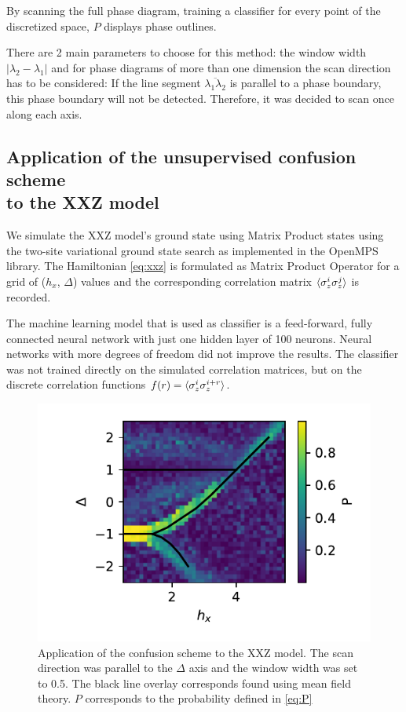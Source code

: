 \documentclass[prl, reprint, twocolumn]{revtex4-1}
\begin{document}
	By scanning the full phase diagram, training a classifier for every point of the discretized space, $P$ displays phase outlines.
	
	There are 2 main parameters to choose for this method: the window width $|\lambda_2-\lambda_1|$ and for phase diagrams of more than one dimension the scan direction has to be considered: If the line segment $\overline{\lambda_1\lambda_2}$ is parallel to a phase boundary, this phase boundary will not be detected.
	Therefore, it was decided to scan once along each axis.
	
	
	
	\subsection{Application of the unsupervised confusion scheme \\ to the XXZ model}
	We simulate the XXZ model's ground state using Matrix Product states\cite{Schollwoeck2011} using the two-site variational ground state search as implemented in the OpenMPS library\cite{Jaschke2018, Wall2012}. The Hamiltonian \ref{eq:xxz} is formulated as Matrix Product Operator for a grid of ($h_x$, $\Delta$) values and the corresponding correlation matrix $\braket{\sigma^i_z\sigma^j_z}$ is recorded.
	
	The machine learning model that is used as classifier is a feed-forward, fully connected neural network with just one hidden layer of 100 neurons. Neural networks with more degrees of freedom did not improve the results. The classifier was not trained directly on the simulated correlation matrices, but on the discrete correlation functions $f(r) = \braket{\sigma^i_z\sigma^{i+r}_z}$.
	
	\begin{figure}[h]
		\includegraphics[width=\columnwidth]{3_5_ConfusionPhaseDiagram2D_1_20181214}
		\caption{Application of the confusion scheme to the XXZ model. The scan direction was parallel to the $\Delta$ axis and the window width was set to 0.5. The black line overlay corresponds found using mean field theory\cite{Dmitriev2002}. $P$ corresponds to the probability defined in \ref{eq:P}}
		\label{fig:confusion}
	\end{figure}
	
\end{document}
